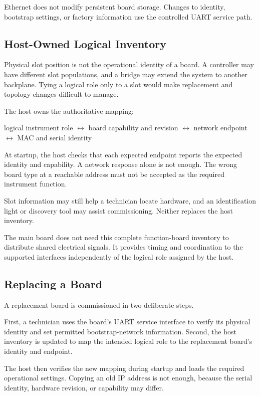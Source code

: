 Ethernet does not modify persistent board storage. Changes to identity, bootstrap settings, or factory information use the controlled UART service path.

\subsection{Host-Owned Logical Inventory}

Physical slot position is not the operational identity of a board. A controller may have different slot populations, and a bridge may extend the system to another backplane. Tying a logical role only to a slot would make replacement and topology changes difficult to manage.

The host owns the authoritative mapping:

\begin{center}
logical instrument role $\longleftrightarrow$ board capability and revision $\longleftrightarrow$ network endpoint $\longleftrightarrow$ MAC and serial identity
\end{center}

At startup, the host checks that each expected endpoint reports the expected identity and capability. A network response alone is not enough. The wrong board type at a reachable address must not be accepted as the required instrument function.

Slot information may still help a technician locate hardware, and an identification light or discovery tool may assist commissioning. Neither replaces the host inventory.

The main board does not need this complete function-board inventory to distribute shared electrical signals. It provides timing and coordination to the supported interfaces independently of the logical role assigned by the host.

\subsection{Replacing a Board}

A replacement board is commissioned in two deliberate steps.

First, a technician uses the board's UART service interface to verify its physical identity and set permitted bootstrap-network information. Second, the host inventory is updated to map the intended logical role to the replacement board's identity and endpoint.

The host then verifies the new mapping during startup and loads the required operational settings. Copying an old IP address is not enough, because the serial identity, hardware revision, or capability may differ.

